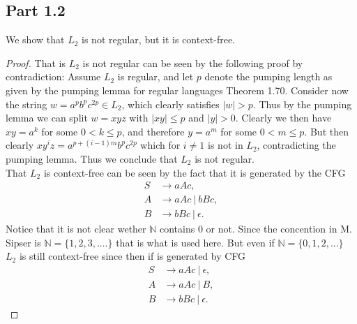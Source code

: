 \documentclass[a4paper,11pt]{article}
\newcommand{\abs}[1]{\left\lvert #1 \right\rvert}
\newcommand{\N}{\mathbb{N}}
\newcommand{\pipe}{\ \vert \ }
\numberwithin{equation}{section}
\begin{document}
	\subsection*{Part 1.2}
	We show that $ L_2 $ is not regular, but it is context-free.
	\begin{proof}
		That is $ L_2 $ is not regular can be seen by the following proof by contradiction: Assume $ L_2 $ is regular, and let $ p $ denote the pumping length as given by the pumping lemma for regular languages Theorem 1.70. Consider now the string $ w=a^pb^pc^{2p}\in L_2 $, which clearly satisfies $ \abs{w}>p $. Thus by the pumping lemma we can split $ w=xyz $ with $ \abs{xy}\leq p $ and $ \abs{y}>0 $. Clearly we then have $ xy=a^k $ for some $ 0<k\leq p $, and therefore $ y=a^m $ for some $ 0<m\leq p $. But then clearly $ xy^iz=a^{p+(i-1)m}b^pc^{2p} $ which for $ i\neq 1 $ is not in $ L_2 $, contradicting the pumping lemma. Thus we conclude that $ L_2 $ is not regular. \\
		That $ L_2 $ is context-free can be seen by the fact that it is generated by the CFG\begin{equation*}
			\begin{aligned}
			S&\to aAc,\\
			A&\to aAc\pipe bBc,\\
			B&\to bBc\pipe\epsilon.
			\end{aligned}
		\end{equation*}
		Notice that it is not clear wether $ \N $ contains $ 0 $ or not. Since the concention in M. Sipser is $ \N=\{1,2,3,....\} $ that is what is used here. But even if $ \N=\{0,1,2,...\} $ $ L_2 $ is still context-free since then if is generated by CFG
		\begin{equation*}
		\begin{aligned}
		S&\to aAc\pipe\epsilon,\\
		A&\to aAc\pipe B,\\
		B&\to bBc\pipe\epsilon.
		\end{aligned}
		\end{equation*}
	\end{proof}
	
\end{document}
